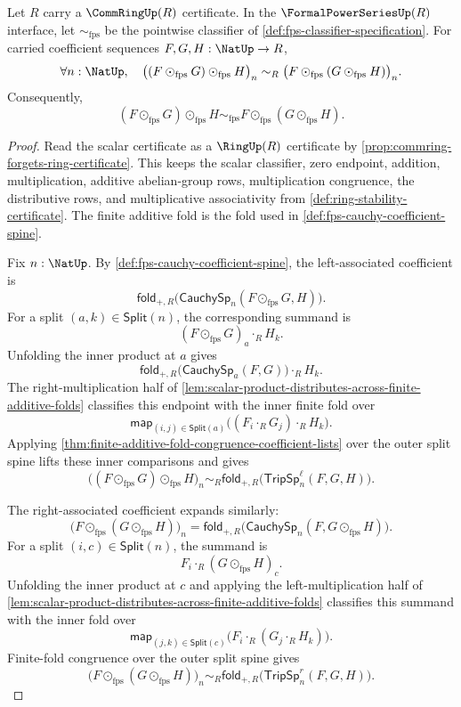 \begin{theorem}
\label{thm:fps-cauchy-product-associativity-from-commring-scalars}
Let $R$ carry a $\CommRingUp(R)$ certificate. In the $\FormalPowerSeriesUp(R)$ interface, let $\sim_{\mathrm{fps}}$ be the pointwise classifier of \autoref{def:fps-classifier-specification}. For carried coefficient sequences $F,G,H:\NatUp\to R$,
$$
\forall n:\NatUp,\quad
\bigl((F\odot_{\mathrm{fps}}G)\odot_{\mathrm{fps}}H\bigr)_n
\sim_R
\bigl(F\odot_{\mathrm{fps}}(G\odot_{\mathrm{fps}}H)\bigr)_n.
$$
Consequently,
$$
(F\odot_{\mathrm{fps}}G)\odot_{\mathrm{fps}}H
\sim_{\mathrm{fps}}
F\odot_{\mathrm{fps}}(G\odot_{\mathrm{fps}}H).
$$
\end{theorem}
\begin{proof}
Read the scalar certificate as a $\RingUp(R)$ certificate by \autoref{prop:commring-forgets-ring-certificate}. This keeps the scalar classifier, zero endpoint, addition, multiplication, additive abelian-group rows, multiplication congruence, the distributive rows, and multiplicative associativity from \autoref{def:ring-stability-certificate}. The finite additive fold is the fold used in \autoref{def:fps-cauchy-coefficient-spine}.

Fix $n:\NatUp$. By \autoref{def:fps-cauchy-coefficient-spine}, the left-associated coefficient is
$$
\mathsf{fold}_{+,R}\bigl(\mathsf{CauchySp}_n(F\odot_{\mathrm{fps}}G,H)\bigr).
$$
For a split $(a,k)\in\mathsf{Split}(n)$, the corresponding summand is
$$
(F\odot_{\mathrm{fps}}G)_a\cdot_R H_k.
$$
Unfolding the inner product at $a$ gives
$$
\mathsf{fold}_{+,R}\bigl(\mathsf{CauchySp}_a(F,G)\bigr)\cdot_R H_k.
$$
The right-multiplication half of \autoref{lem:scalar-product-distributes-across-finite-additive-folds} classifies this endpoint with the inner finite fold over
$$
\mathsf{map}_{(i,j)\in\mathsf{Split}(a)}
\bigl((F_i\cdot_R G_j)\cdot_R H_k\bigr).
$$
Applying \autoref{thm:finite-additive-fold-congruence-coefficient-lists} over the outer split spine lifts these inner comparisons and gives
$$
\bigl((F\odot_{\mathrm{fps}}G)\odot_{\mathrm{fps}}H\bigr)_n
\sim_R
\mathsf{fold}_{+,R}\bigl(\mathsf{TripSp}^{\ell}_n(F,G,H)\bigr).
$$

The right-associated coefficient expands similarly:
$$
\bigl(F\odot_{\mathrm{fps}}(G\odot_{\mathrm{fps}}H)\bigr)_n
=
\mathsf{fold}_{+,R}\bigl(\mathsf{CauchySp}_n(F,G\odot_{\mathrm{fps}}H)\bigr).
$$
For a split $(i,c)\in\mathsf{Split}(n)$, the summand is
$$
F_i\cdot_R(G\odot_{\mathrm{fps}}H)_c.
$$
Unfolding the inner product at $c$ and applying the left-multiplication half of \autoref{lem:scalar-product-distributes-across-finite-additive-folds} classifies this summand with the inner fold over
$$
\mathsf{map}_{(j,k)\in\mathsf{Split}(c)}
\bigl(F_i\cdot_R(G_j\cdot_R H_k)\bigr).
$$
Finite-fold congruence over the outer split spine gives
$$
\bigl(F\odot_{\mathrm{fps}}(G\odot_{\mathrm{fps}}H)\bigr)_n
\sim_R
\mathsf{fold}_{+,R}\bigl(\mathsf{TripSp}^{r}_n(F,G,H)\bigr).
$$


\end{proof}
